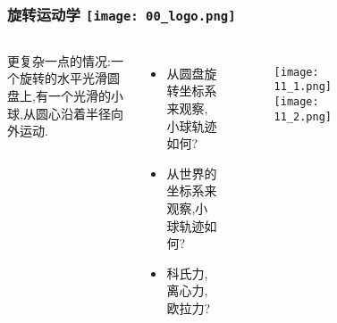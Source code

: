 \begin{frame}
  \frametitle{旋转运动学 \hfill \texttt{[image: 00\_logo.png]}}
  \begin{columns}
    更复杂一点的情况:一个旋转的水平光滑圆盘上,有一个光滑的小球,从圆心沿着半径向外运动.
    
    \begin{itemize}
      \item 从圆盘旋转坐标系来观察,小球轨迹如何?
      \item 从世界的坐标系来观察,小球轨迹如何?
      \item 科氏力,离心力,欧拉力?
      
    \end{itemize}

    \begin{figure}[h]
      \texttt{[image: 11\_1.png]}
      \qquad
      \texttt{[image: 11\_2.png]}

    \end{figure}
    \begin{figure}[h]
    \end{figure}
    
  \end{columns}
  \end{frame}


